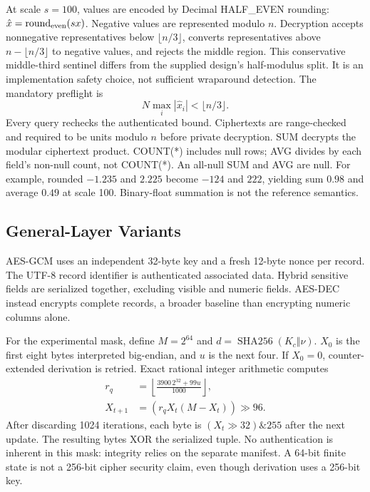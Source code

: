 \documentclass[conference]{IEEEtran}
\begin{document}
At scale $s=100$, values are encoded by Decimal HALF\_EVEN rounding: $\hat{x}=\operatorname{round}_{\rm even}(sx)$. Negative values are represented modulo $n$. Decryption accepts nonnegative representatives below $\lfloor n/3\rfloor$, converts representatives above $n-\lfloor n/3\rfloor$ to negative values, and rejects the middle region. This conservative middle-third sentinel differs from the supplied design's half-modulus split. It is an implementation safety choice, not sufficient wraparound detection. The mandatory preflight is
\begin{equation}
N\max_i|\hat{x}_i|<\lfloor n/3\rfloor.
\end{equation}
Every query rechecks the authenticated bound. Ciphertexts are range-checked and required to be units modulo $n$ before private decryption. SUM decrypts the modular ciphertext product. COUNT(*) includes null rows; AVG divides by each field's non-null count, not COUNT(*). An all-null SUM and AVG are null. For example, rounded $-1.235$ and $2.225$ become $-124$ and $222$, yielding sum $0.98$ and average $0.49$ at scale 100. Binary-float summation is not the reference semantics.

\subsection{General-Layer Variants}
AES-GCM uses an independent 32-byte key and a fresh 12-byte nonce per record. The UTF-8 record identifier is authenticated associated data. Hybrid sensitive fields are serialized together, excluding visible and numeric fields. AES-DEC instead encrypts complete records, a broader baseline than encrypting numeric columns alone.

For the experimental mask, define $M=2^{64}$ and $d=\operatorname{SHA256}(K_c\Vert\nu)$. $X_0$ is the first eight bytes interpreted big-endian, and $u$ is the next four. If $X_0=0$, counter-extended derivation is retried. Exact rational integer arithmetic computes
\begin{align}
r_q&=\left\lfloor\frac{3900\,2^{32}+99u}{1000}\right\rfloor,\\
X_{t+1}&=(r_q X_t(M-X_t))\gg96.
\end{align}
After discarding 1024 iterations, each byte is $(X_t\gg32)\mathbin{\&}255$ after the next update. The resulting bytes XOR the serialized tuple. No authentication is inherent in this mask: integrity relies on the separate manifest. A 64-bit finite state is not a 256-bit cipher security claim, even though derivation uses a 256-bit key.
\end{document}
